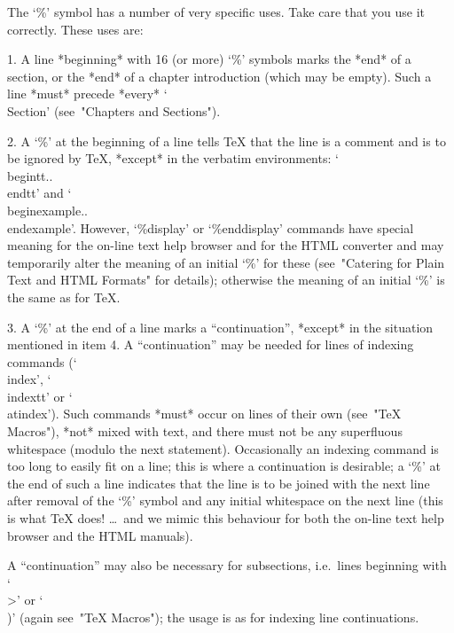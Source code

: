 

\indextt{\%}
The `\%' symbol has a number of very specific uses. Take  care  that  you
use it correctly. These uses are:
\beginlist%
\item{1.}
A line *beginning* with 16 (or more) `\%' symbols marks the  *end*  of  a
section, or the *end* of a chapter introduction  (which  may  be  empty).
Such  a  line  *must*  precede  *every*  `\\Section'  (see~"Chapters  and
Sections").

\item{2.}
A `\%' at the beginning of a line tells {\TeX} that the line is a comment
and is to be ignored by {\TeX}, *except* in  the  verbatim  environments:
`\\begintt..\\endtt'   and    `\\beginexample..\\endexample'.    However,
`\%display' or `\%enddisplay'  commands  have  special  meaning  for  the
on-line text help browser and for the HTML converter and may  temporarily
alter the meaning of an initial `\%' for these (see~"Catering  for  Plain
Text and HTML Formats" for details); otherwise the meaning of an  initial
`\%' is the same as for {\TeX}.

\item{3.}
A `\%' at the end of a line marks a  ``continuation'',  *except*  in  the
situation mentioned in item 4. A ``continuation'' may be needed for lines
of  indexing  commands  (`\\index',  `\\indextt'  or  `\\atindex').  Such
commands *must* occur on lines of their  own  (see~"TeX  Macros"),  *not*
mixed with text, and there must not be any superfluous whitespace (modulo
the next statement). Occasionally an indexing  command  is  too  long  to
easily fit on a line; this is where a continuation is desirable;  a  `\%'
at the end of such a line indicates that the line is to  be  joined  with
the next line after removal of the `\%' symbol and any initial whitespace
on the next line (this is what  {\TeX}  does!  \dots~and  we  mimic  this
behaviour for both the on-line text help browser and the HTML manuals).

A ``continuation'' may also  be  necessary  for  subsections,  i.e.~lines
beginning with `\\>' or `\\)' (again see~"TeX Macros"); the usage  is  as
for indexing line continuations.

